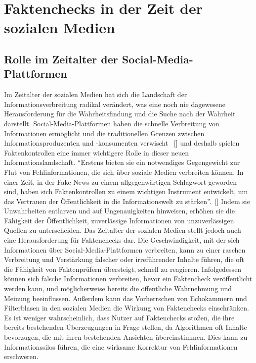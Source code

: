\documentclass[a4paper,listof=totoc,bibliography=totoc]{scrartcl}
\begin{document}
\section{Faktenchecks in der Zeit der sozialen Medien}

\subsection{Rolle im Zeitalter der Social-Media-Plattformen}

Im Zeitalter der sozialen Medien hat sich die Landschaft der Informationsverbreitung radikal verändert, was eine noch nie dagewesene Herausforderung für 
die Wahrheitsfindung und die Suche nach der Wahrheit darstellt. Social-Media-Plattformen haben die schnelle Verbreitung von Informationen ermöglicht und 
die traditionellen Grenzen zwischen Informationsproduzenten und -konsumenten verwischt ~[\cite{Vosoughi2018}] und deshalb spielen Faktenkontrollen eine 
immer wichtigere Rolle in dieser neuen Informationslandschaft. ``Erstens bieten sie ein notwendiges Gegengewicht zur Flut von Fehlinformationen, die sich 
über soziale Medien verbreiten können. In einer Zeit, in der Fake News zu einem allgegenwärtigen Schlagwort geworden sind, haben sich Faktenkontrollen 
zu einem wichtigen Instrument entwickelt, um das Vertrauen der Öffentlichkeit in die Informationswelt zu stärken''.~[\cite{lewandowsky2020}] 
Indem sie Unwahrheiten entlarven und auf Ungenauigkeiten hinweisen, erhöhen sie die Fähigkeit der Öffentlichkeit, zuverlässige Informationen von unzuverlässigen 
Quellen zu unterscheiden. Das Zeitalter der sozialen Medien stellt jedoch auch eine Herausforderung für Faktenchecks dar. Die Geschwindigkeit, mit der sich Informationen 
über Social-Media-Plattformen verbreiten, kann zu einer raschen Verbreitung und Verstärkung falscher oder irreführender Inhalte führen, die oft die Fähigkeit von 
Faktenprüfern übersteigt, schnell zu reagieren. Infolgedessen können sich falsche Informationen verbreiten, bevor ein Faktencheck veröffentlicht werden kann, und 
möglicherweise bereits die öffentliche Wahrnehmung und Meinung beeinflussen. Außerdem kann das Vorherrschen von Echokammern und Filterblasen in den sozialen 
Medien die Wirkung von Faktenchecks einschränken. Es ist weniger wahrscheinlich, dass Nutzer auf Faktenchecks stoßen, die ihre bereits bestehenden Überzeugungen 
in Frage stellen, da Algorithmen oft Inhalte bevorzugen, die mit ihren bestehenden Ansichten übereinstimmen. Dies kann zu Informationssilos führen, die eine wirksame 
Korrektur von Fehlinformationen erschweren.
\end{document}

